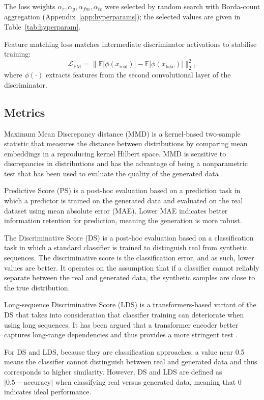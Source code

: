 \documentclass[make,article,submit,moreauthors]{Definitions/mdpi}
\begin{document}
The loss weights $\alpha_{r}, \alpha_{g}, \alpha_{fm}, \alpha_{tc}$ were selected by random search with Borda-count aggregation (Appendix~\ref{app:hyperparams}); the selected values are given in Table~\ref{tab:hyperparam}. 


Feature matching loss matches intermediate discriminator activations to stabilise training:
\begin{equation}
  \mathcal{L}_{\text{FM}} = \big\| \mathbb{E}\big[\phi(x_{\text{real}})\big] - \mathbb{E}\big[\phi(x_{\text{fake}})\big] \big\|_{2}^{2},
\end{equation}
where $\phi(\cdot)$ extracts features from the second convolutional layer of the discriminator.


\subsection{Metrics}
Maximum Mean Discrepancy distance (MMD) \cite{ref33,ref34,ref35} is a kernel-based two-sample statistic that measures the distance between distributions by comparing mean embeddings in a reproducing kernel Hilbert space. MMD is sensitive to discrepancies in distributions and has the advantage of being a nonparametric test that has been used to evaluate the quality of the generated data \cite{ref8}.

Predictive Score (PS) \cite{ref2} is a post-hoc evaluation based on a prediction task in which a predictor is trained on the generated data and evaluated on the real dataset using mean absolute error (MAE). Lower MAE indicates better information retention for prediction, meaning the generation is more robust.

The Discriminative Score (DS) \cite{ref2} is a post-hoc evaluation based on a classification task in which a standard classifier is trained to distinguish real from synthetic sequences. The discriminative score is the classification error, and as such, lower values are better. It operates on the assumption that if a classifier cannot reliably separate between the real and generated data, the synthetic samples are close to the true distribution. 

Long-sequence Discriminative Score (LDS) \cite{ref29} is a transformers-based variant of the DS that takes into consideration that classifier training can deteriorate when using long sequences. It has been argued that a transformer encoder better captures long-range dependencies and thus provides a more stringent test \cite{ref29}. 

For DS and LDS, because they are classification approaches, a value near 0.5 means the classifier cannot distinguish between real and generated data and thus corresponds to higher similarity. However, DS and LDS are defined as $|0.5 - \text{accuracy}|$ when classifying real versus generated data, meaning that 0 indicates ideal performance. 
\end{document}

